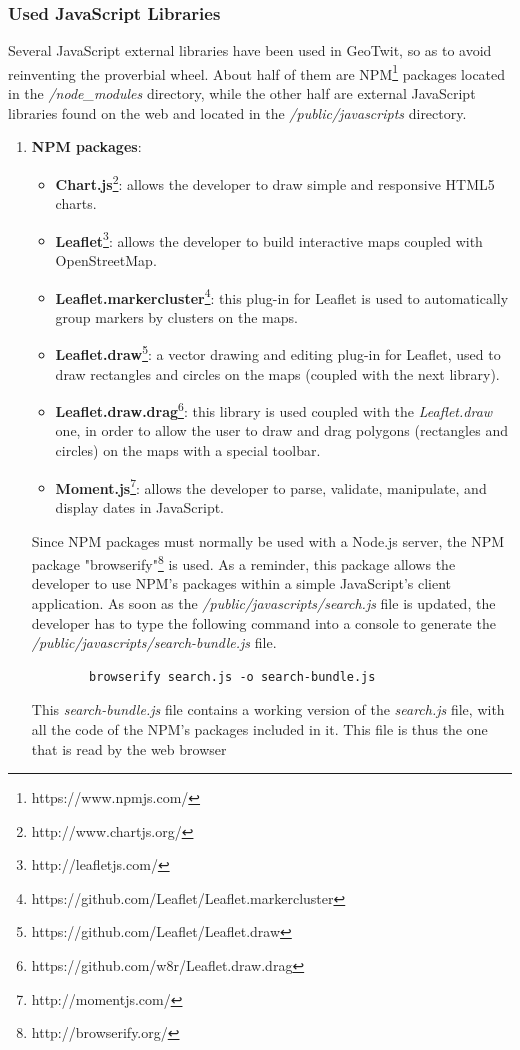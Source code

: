 \documentclass[a4paper,11pt]{report}
\begin{document}
\subsubsection{Used JavaScript Libraries}
\label{usedJavascriptLibraries}
Several JavaScript external libraries have been used in GeoTwit, so as to avoid reinventing the proverbial wheel. About half of them are NPM\footnote{https://www.npmjs.com/} packages located in the \emph{/node\_modules} directory, while the other half are external JavaScript libraries found on the web and located in the \emph{/public/javascripts} directory.
\begin{enumerate}
	\item \textbf{NPM packages}:
	\begin{itemize}
		\item \textbf{Chart.js}\footnote{http://www.chartjs.org/}: allows the developer to draw simple and responsive HTML5 charts.
		\item \textbf{Leaflet}\footnote{http://leafletjs.com/}: allows the developer to build interactive maps coupled with OpenStreetMap.
		\item \textbf{Leaflet.markercluster}\footnote{https://github.com/Leaflet/Leaflet.markercluster}: this plug-in for Leaflet is used to automatically group markers by clusters on the maps.
		\item \textbf{Leaflet.draw}\footnote{https://github.com/Leaflet/Leaflet.draw}: a vector drawing and editing plug-in for Leaflet, used to draw rectangles and circles on the maps (coupled with the next library).
		\item \textbf{Leaflet.draw.drag}\footnote{https://github.com/w8r/Leaflet.draw.drag}: this library is used coupled with the \emph{Leaflet.draw} one, in order to allow the user to draw and drag polygons (rectangles and circles) on the maps with a special toolbar.
		\item \textbf{Moment.js}\footnote{http://momentjs.com/}: allows the developer to parse, validate, manipulate, and display dates in JavaScript.
	\end{itemize}
	\newpage

	Since NPM packages must normally be used with a Node.js server, the NPM package "browserify"\footnote{http://browserify.org/} is used. As a reminder, this package allows the developer to use NPM's packages within a simple JavaScript's client application.  As soon as the \emph{/public/javascripts/search.js} file is updated, the developer has to type the following command into a console to generate the \emph{/public/javascripts/search-bundle.js} file.
	\begin{lstlisting}
		browserify search.js -o search-bundle.js
	\end{lstlisting}
	This \emph{search-bundle.js} file contains a working version of the \emph{search.js} file, with all the code of the NPM's packages included in it. This file is thus the one that is read by the web browser


\end{enumerate}
\end{document}
